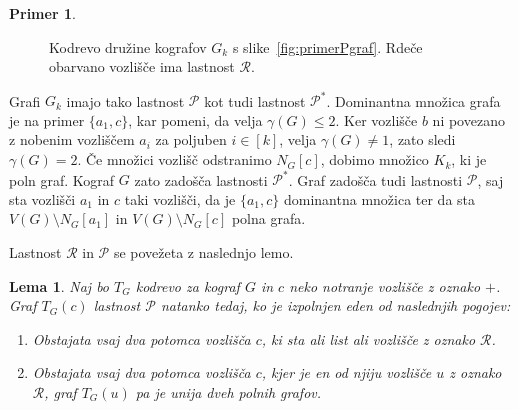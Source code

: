 \documentclass[12pt,a4paper,twoside]{article}
\theoremstyle{definition} %
\newtheorem{primer}[definicija]{Primer}
\theoremstyle{plain} %
\newtheorem{lema}[definicija]{Lema}
\numberwithin{equation}{section}  %
\begin{document}
\begin{primer}
\begin{figure}[h]
\caption{Kodrevo družine kografov $G_k$ s slike~\ref{fig:primerPgraf}. Rdeče obarvano vozlišče ima lastnost $\mathcal{R}$.}
\label{fig:primerPdrevo}
\end{figure}

Grafi $G_k$ imajo tako lastnost $\mathcal{P}$ kot tudi lastnost $\mathcal{P^*}$. Dominantna množica grafa je na primer $\{a_1, c\}$, kar pomeni, da velja $\gamma(G) \leq 2$. Ker vozlišče $b$ ni povezano z nobenim vozliščem $a_i$ za poljuben $i \in [k]$, velja $\gamma(G) \neq 1$, zato sledi $\gamma(G) = 2$. Če množici vozlišč odstranimo $N_G[c]$, dobimo množico $K_k$, ki je poln graf. Kograf $G$ zato zadošča lastnosti  $\mathcal{P^*}$. 
Graf zadošča tudi lastnosti $\mathcal{P}$, saj sta vozlišči $a_1$ in $c$ taki vozlišči, da je $\{a_1, c\}$ dominantna množica ter da sta $V(G) \setminus N_G[a_1]$  in $V(G) \setminus N_G[c]$ polna grafa.
\end{primer}


Lastnost $\mathcal{R}$ in $\mathcal{P}$ se povežeta z naslednjo lemo.

\begin{lema}\label{Lema2} Naj bo $T_G$ kodrevo za kograf $G$ in $c$ neko notranje vozlišče z oznako $+$. Graf $T_G(c)$ lastnost $\mathcal{P}$ natanko tedaj, ko je izpolnjen eden od naslednjih pogojev:
\begin{enumerate}[label=($\roman*$)]
\item Obstajata vsaj dva potomca vozlišča $c$, ki sta ali list ali vozlišče z oznako $\mathcal{R}$.
\item Obstajata vsaj dva potomca vozlišča $c$, kjer je en od njiju vozlišče $u$ z oznako $\mathcal{R}$, graf $T_G(u)$ pa je unija dveh polnih grafov.
\end{enumerate}
\end{lema}
\end{document}
